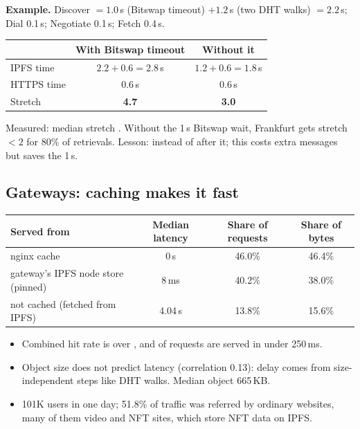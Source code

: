 \textbf{Example.} Discover $= 1.0$\,s (Bitswap timeout) $+ 1.2$\,s (two DHT walks) $= 2.2$\,s; Dial 0.1\,s; Negotiate 0.1\,s; Fetch 0.4\,s.
\begin{center}
\begin{tabular}{@{}lcc@{}}
\toprule
 & With Bitswap timeout & Without it\\
\midrule
IPFS time & $2.2 + 0.6 = 2.8$\,s & $1.2 + 0.6 = 1.8$\,s\\
HTTPS time & 0.6\,s & 0.6\,s\\
Stretch & \textbf{4.7} & \textbf{3.0}\\
\bottomrule
\end{tabular}
\end{center}
Measured: median stretch . Without the 1\,s Bitswap wait, Frankfurt gets stretch $< 2$ for 80\% of retrievals. Lesson:  instead of after it; this costs extra messages but saves the 1\,s.

\subsection{Gateways: caching makes it fast}
\begin{center}
\begin{tabular}{@{}lccc@{}}
\toprule
Served from & Median latency & Share of requests & Share of bytes\\
\midrule
nginx cache & 0\,s & 46.0\% & 46.4\%\\
gateway's IPFS node store (pinned) & 8\,ms & 40.2\% & 38.0\%\\
not cached (fetched from IPFS) & 4.04\,s & 13.8\% & 15.6\%\\
\bottomrule
\end{tabular}
\end{center}
\begin{itemize}
  \item Combined hit rate is over , and  of requests are served in under 250\,ms.
  \item Object size does not predict latency (correlation 0.13): delay comes from size-independent steps like DHT walks. Median object 665\,KB.
  \item 101K users in one day; 51.8\% of traffic was referred by ordinary websites, many of them video and NFT sites, which store NFT data on IPFS.
\end{itemize}

